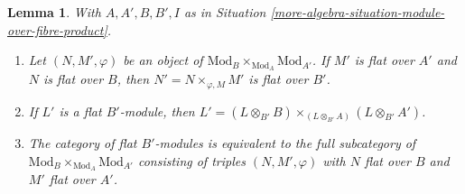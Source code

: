 \documentclass{amsart}
\theoremstyle{plain}
\newtheorem{lemma}[subsection]{Lemma}
\theoremstyle{definition}
\theoremstyle{remark}
\numberwithin{equation}{subsection}
\begin{document}
\begin{lemma}
\label{more-algebra-lemma-flat-module-over-fibre-product}
With $A, A', B, B', I$ as in
Situation \ref{more-algebra-situation-module-over-fibre-product}.
\begin{enumerate}
\item Let $(N, M', \varphi)$ be an object of
$\text{Mod}_B \times_{\text{Mod}_A} \text{Mod}_{A'}$.
If $M'$ is flat over $A'$ and $N$ is flat over $B$, then
$N' = N \times_{\varphi, M} M'$ is flat over $B'$.
\item If $L'$ is a flat $B'$-module, then
$L' = (L \otimes_{B'} B) \times_{(L \otimes_{B'} A)} (L \otimes_{B'} A')$.
\item The category of flat $B'$-modules is equivalent to the
full subcategory of $\text{Mod}_B \times_{\text{Mod}_A} \text{Mod}_{A'}$
consisting of triples
$(N, M', \varphi)$ with $N$ flat over $B$ and $M'$ flat over $A'$.
\end{enumerate}
\end{lemma}
\end{document}
